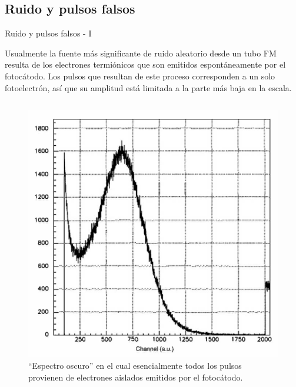 \documentclass[a4paper,10pt]{beamer}
\begin{document}
\subsection{Ruido y pulsos falsos}
\begin{frame}{Ruido y pulsos falsos - I}
 \begin{justify}
  
  Usualmente la fuente más significante de ruido aleatorio desde un tubo FM resulta 
  de los electrones termiónicos que son emitidos espontáneamente por el fotocátodo.
  Los pulsos que resultan de este proceso corresponden a un solo fotoelectrón, así que 
  su amplitud está limitada a la parte más baja en la escala.
  
 \end{justify}
 
 \begin{columns}[c]
  
 \column{2in}
 \begin{figure}
  \center 
  \includegraphics[scale=0.25]{fig27}
  \caption{``Espectro oscuro'' en el cual esencialmente todos los pulsos provienen de 
  electrones aislados emitidos por el fotocátodo.}
 \end{figure}


\end{columns}
\end{frame}
\end{document}
